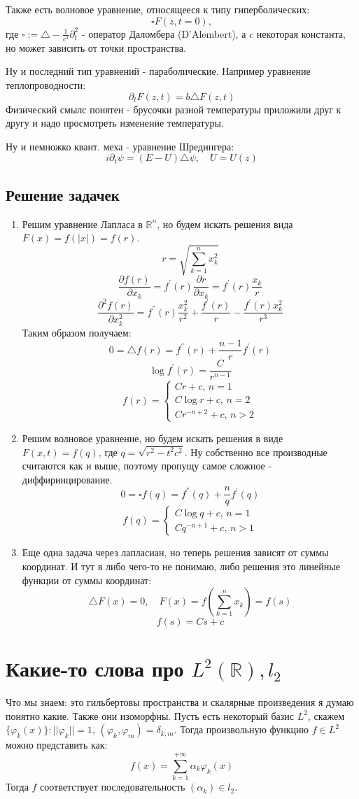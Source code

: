 \documentclass[12pt,a4paper]{article} %
\newcommand{\R}{\mathbb{R}}
\begin{document}
	Также есть волновое уравнение, относящееся к типу гиперболических:
	$$\square F(z,t=0),$$
	где $\square:=\triangle-\frac{1}{c^2}\partial_t^2$ - оператор Даломбера (D'Alembert), а $c$ некоторая константа, но может зависить от точки пространства.
	
	Ну и последний тип уравнений - параболические. Например уравнение теплопроводности:
	$$\partial_t F(z,t)=b\triangle F(z,t)$$
	Физический смылс понятен - брусочки разной температуры приложили друг к другу и надо просмотреть изменение температуры.
	
	Ну и немножко квант. меха - уравнение Шредингера:
	$$i\partial_t\psi=(E-U)\triangle\psi,\quad U=U(z)$$
	\subsection{Решение задачек}
	\begin{enumerate}
		\item Решим уравнение Лапласа в $\R^n$, но будем искать решения вида $F(x)=f(|x|)=f(r)$.
		$$r=\sqrt{\sum_{k=1}^nx_k^2}$$
		$$\frac{\partial f(r)}{\partial x_k}=f^{'}(r)\frac{\partial r}{\partial x_k}=f^{'}(r)\frac{x_k}{r}$$
		$$\frac{\partial^2 f(r)}{\partial x_k^2}=f^{''}(r)\frac{x_k^2}{r^2}+\frac{f^{'}(r)}{r}-\frac{f^{'}(r)x_k^2}{r^3}$$
		Таким образом получаем:
		$$0=\triangle f(r)=f^{''}(r)+\frac{n-1}{r}f^{'}(r)$$
		$$\log f^{'}(r)=\frac{C}{r^{n-1}}$$
		$$f(r)=
		\begin{cases}
		Cr+c,\,n=1 \\
		C\log r+c,\,n=2 \\
		Cr^{-n+2}+c,\,n>2
		\end{cases}
		$$
		\item Решим волновое уравнение, но будем искать решения в виде $F(x,t)=f(q)$, где $q=\sqrt{r^2-t^2c^2}$. Ну собственно все производные считаются как и выше, поэтому пропущу самое сложное - диффиринцирование.
		$$0=\square f(q)=f^{''}(q)+\frac{n}{q}f^{'}(q)$$
		$$f(q)=
		\begin{cases}
		C\log q+c,\,n=1 \\
		Cq^{-n+1}+c,\,n>1
		\end{cases}
		$$
		\item Еще одна задача через лапласиан, но теперь решения зависят от суммы координат. И тут я либо чего-то не понимаю, либо решения это линейные функции от суммы координат:
		$$\triangle F(x)=0,\quad F(x)=f(\sum_{k=1}^nx_k)=f(s)$$
		$$f(s)=Cs+c$$
	\end{enumerate}
	\section{Какие-то слова про $L^2(\R),l_2$}
	Что мы знаем: это гильбертовы пространства и скалярные произведения я думаю понятно какие. Также они изоморфны. Пусть есть некоторый базис $L^2$, скажем $\{\varphi_k(x)\}:||\varphi_k||=1,\,(\varphi_k,\varphi_m)=\delta_{k,m}$. Тогда произвольную функцию $f\in L^2$ можно представить как:
	$$f(x)=\sum_{k=1}^{+\infty}\alpha_k\varphi_k(x)$$
	Тогда $f$ соответствует последовательность $(\alpha_k)\in l_2$.
	
\end{document}
